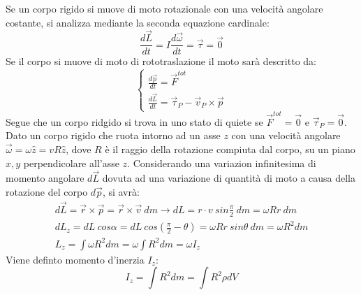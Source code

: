 \documentclass{article}
\numberwithin{equation}{subsection}
\begin{document}
Se un corpo rigido si muove di moto rotazionale con una velocità 
angolare costante, si analizza mediante la seconda equazione cardinale:
\begin{equation}
    \displaystyle\frac{d\vec{L}}{dt}=I\frac{d\vec\omega}{dt}=\vec{\tau}=\vec0
\end{equation}
Se il corpo si muove di moto di rototraslazione il moto 
sarà descritto da:
\begin{equation}
    \begin{cases}
        \displaystyle\frac{d\vec{p}}{dt}=\vec{F}^{tot}\\
        \displaystyle\frac{d\vec{L}}{dt}=\vec{\tau}_P-\vec{v}_P\times\vec{p}
    \end{cases}
\end{equation}
Segue che un corpo ridgido si trova in uno stato di quiete se 
$\vec{F}^{tot}=\vec{0}$ e $\vec{\tau}_P=\vec{0}$. \\
Dato un corpo rigido che ruota intorno ad un asse $z$ con una 
velocità angolare $\vec{\omega}=\omega\hat{z}=vR\hat{z}$, dove 
$R$ è il raggio della rotazione compiuta dal corpo, su un piano $x,y$ 
perpendicolare all'asse $z$. Considerando una variazion infinitesima 
di momento angolare $d\vec{L}$ dovuta ad una variazione di 
quantità di moto a causa della rotazione del corpo $d\vec{p}$, 
si avrà:
\begin{gather}
    d\vec{L}=\vec{r}\times\vec{p}=\vec{r}\times\vec{v}\:dm\rightarrow dL=r\cdot v\:sin\displaystyle\frac{\pi}{2}\:dm=\omega Rr\:dm\\
    dL_z=dL\:cos\alpha=dL\:cos\left(\displaystyle\frac{\pi}{2}-\theta\right)=\omega Rr\:sin\theta\:dm=\omega R^2dm\\
    L_z=\displaystyle\int\omega R^2dm=\omega\int R^2dm=\omega I_z
\end{gather}
Viene definto momento d'inerzia $I_z$:
\begin{equation}
    I_z=\displaystyle\int R^2dm=\int R^2\rho dV
\end{equation}
\end{document}
